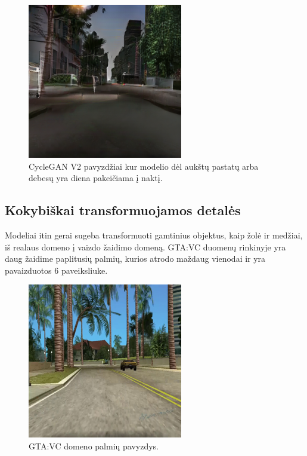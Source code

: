 \documentclass{VUMIFPSkursinis}
\begin{document}
\begin{figure}[H]
            \includegraphics[scale=0.7]{img/debesu_fake}
            \caption{CycleGAN V2 pavyzdžiai kur modelio dėl aukštų pastatų arba debesų yra diena  pakeičiama į naktį.}
            \label{img:mlp}
        \end{figure}
    \subsection*{Kokybiškai transformuojamos detalės}
        Modeliai itin gerai sugeba transformuoti gamtinius objektus, kaip žolė ir medžiai, iš realaus domeno į vaizdo žaidimo domeną. GTA:VC duomenų rinkinyje yra daug žaidime paplitusių palmių, kurios atrodo maždaug vienodai ir yra pavaizduotos 6 paveiksliuke.
        \begin{figure}[H]
            \centering
            \includegraphics[scale=0.7]{img/palmiu_pvz}
            \caption{GTA:VC domeno palmių pavyzdys.}
            \label{img:mlp}
        \end{figure}
\end{document}
